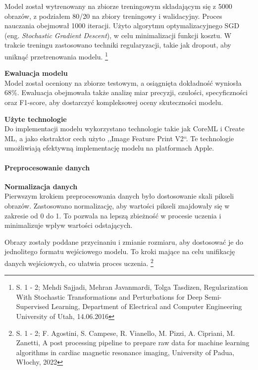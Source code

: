 \documentclass[12pt, a4paper, twoside, openany]{book}
\newcommand{\forceindent}{\leavevmode{\parindent=1.3em\indent}}
\begin{document}
Model został wytrenowany na zbiorze treningowym składającym się z 5000 obrazów, z podziałem 80/20 na zbiory treningowy i walidacyjny.
Proces nauczania obejmował 1000 iteracji.
Użyto algorytmu optymalizacyjnego SGD (eng. \textit{Stochastic Gradient Descent}), w celu minimalizacji funkcji kosztu.
W trakcie treningu zastosowano techniki regularyzacji, takie jak dropout, aby uniknąć przetrenowania modelu. \footnote{
    S. 1 - 2; Mehdi Sajjadi, Mehran Javanmardi, Tolga Tasdizen, Regularization With Stochastic Transformations and Perturbations for Deep Semi-Supervised Learning, Department of Electrical and Computer Engineering University of Utah, 14.06.2016
}

\textbf{Ewaluacja modelu\\}
\forceindent Model został oceniony na zbiorze testowym, a osiągnięta dokładność wyniosła 68\%. 
Ewaluacja obejmowała także analizę miar precyzji, czułości, specyficzności oraz F1-score, aby dostarczyć kompleksowej oceny skuteczności modelu.

\textbf{Użyte technologie\\}
\forceindent Do implementacji modelu wykorzystano technologie takie jak CoreML i Create ML, a jako ekstraktor cech użyto ,,Image Feature Print V2``. 
Te technologie umożliwiają efektywną implementację modelu na platformach Apple.

\paragraph{Preprocesowanie danych\\}
\forceindent \textbf{ Normalizacja danych\\}
\indent Pierwszym krokiem preprocesowania danych było dostosowanie skali pikseli obrazów.
Zastosowano normalizację, aby wartości pikseli znajdowały się w zakresie od 0 do 1.
To pozwala na lepszą zbieżność w procesie uczenia i minimalizuje wpływ wartości odstających.

Obrazy zostały poddane przycinaniu i zmianie rozmiaru, aby dostosować je do jednolitego formatu wejściowego modelu.
To kroki mające na celu unifikację danych wejściowych, co ułatwia proces uczenia. \footnote{
    S. 1 - 2; F. Agostini, S. Campese, R. Vianello, M. Pizzi, A. Cipriani, M. Zanetti, A post processing pipeline to prepare raw data for machine learning algorithms in cardiac magnetic resonance imaging, University of Padua, Włochy, 2022
}
\end{document}
